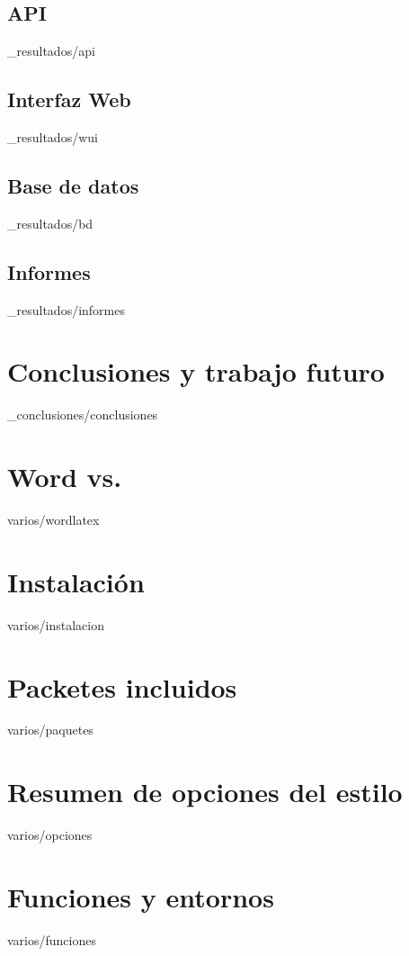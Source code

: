 \documentclass[epsbased,copyright,final,printable,covers,extendedindex,firstnumbered,tfg,gnuplot]{tfgtfmthesisuam}
\begin{document}
  \section{API\label{SEC:API}}{_resultados/api}
  \section{Interfaz Web\label{SEC:WUI}}{_resultados/wui}
  \section{Base de datos\label{SEC:BD}}{_resultados/bd}
  \section{Informes\label{SEC:INFORMES}}{_resultados/informes}

\chapter{Conclusiones y trabajo futuro\label{CAP:ELEMINT}}{_conclusiones/conclusiones}

\appendix

\chapter{Word\textsuperscript{\textregistered} vs. \LaTeXe\label{CAP:WORDLATEX}}{varios/wordlatex}
\chapter{Instalación\label{CAP:INSTALACION}}{varios/instalacion}
\chapter{Packetes incluidos\label{CAP:PAQUETES}}{varios/paquetes}
\chapter{Resumen de opciones del estilo\label{CAP:OPCIONES}}{varios/opciones}
\chapter{Funciones y entornos\label{CAP:FUNCENT}}{varios/funciones}
\end{document}
